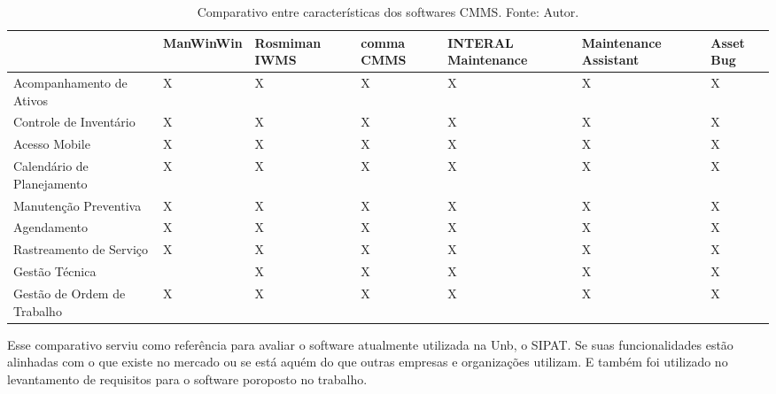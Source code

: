 \begin{landscape}
\begin{table}[H]
\centering
\caption{Comparativo entre características dos softwares CMMS. Fonte: Autor.}
\label{comparativo}
\begin{tabular}{ | p{6cm} | p{3cm} | p{2cm} | p{2cm} | p{3cm} | p{3cm} | p{2cm} | }
\hline
	      & ManWinWin & Rosmiman IWMS & comma CMMS & INTERAL Maintenance & Maintenance Assistant & Asset Bug \\ \hline
	Acompanhamento de Ativos & X & X & X & X & X & X \\ \hline
	Controle de Inventário & X & X & X & X & X & X \\ \hline
	Acesso Mobile & X & X & X & X & X & X \\ \hline
	Calendário de Planejamento & X & X & X & X & X & X \\ \hline
	Manutenção Preventiva & X & X & X & X & X & X \\ \hline
	Agendamento & X & X & X & X & X & X \\ \hline
	Rastreamento de Serviço & X & X & X & X & X & X \\ \hline
	Gestão Técnica &  & X & X & X & X & X \\ \hline
	Gestão de Ordem de Trabalho & X & X & X & X & X & X \\ \hline
\end{tabular}
\end{table}
\end{landscape}


Esse comparativo serviu como referência para avaliar o software atualmente utilizada na Unb, o SIPAT. Se suas funcionalidades estão alinhadas com o que existe no mercado ou se está aquém do que outras empresas e organizações utilizam. E também foi utilizado no levantamento de requisitos para o software poroposto no trabalho.
